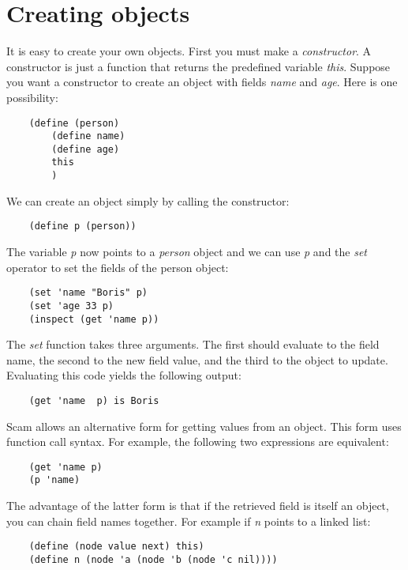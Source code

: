 \section{Creating objects}

It is easy to create your own objects. First you must make a
{\it constructor}. A constructor is just a function that returns 
the predefined variable {\it this}. Suppose you want a constructor to
create an object with fields {\it name} and {\it age}. Here is 
one possibility:

\begin{verbatim}
    (define (person)
        (define name)
        (define age)
        this
        )
\end{verbatim}

We can create an object simply by calling the constructor:

\begin{verbatim}
    (define p (person))
\end{verbatim}

The variable {\it p} now points to a {\it person} object and we
can use {\it p} and the {\it set} operator to
set the fields of the person object:

\begin{verbatim}
    (set 'name "Boris" p)
    (set 'age 33 p)
    (inspect (get 'name p))
\end{verbatim}

The {\it set} function takes three arguments. The first should evaluate
to the field name, the second to the new field value, and the third
to the object to update.
Evaluating this code yields the following output:

\begin{verbatim}
    (get 'name  p) is Boris
\end{verbatim}

Scam allows an alternative form for getting values from an object.
This form uses function call syntax. For example, the following two expressions
are equivalent:

\begin{verbatim}
    (get 'name p)
    (p 'name)
\end{verbatim}

The advantage of the latter form is that if the retrieved field is
itself an object, you can chain field names together.
For example if {\it n} points
to a linked list:

\begin{verbatim}
    (define (node value next) this)
    (define n (node 'a (node 'b (node 'c nil))))
\end{verbatim}
    
